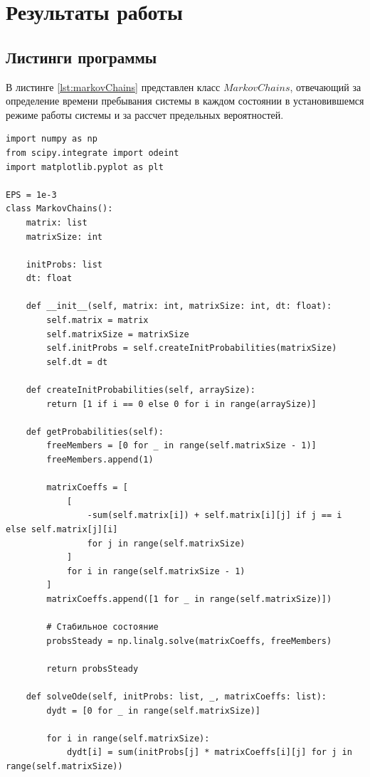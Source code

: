 \chapter{Результаты работы}

\section{Листинги программы}

В листинге \ref{lst:markovChains} представлен класс $MarkovChains$, отвечающий за определение времени пребывания системы в каждом состоянии в установившемся режиме работы системы и за рассчет предельных вероятностей.

\begin{lstlisting}[label=lst:markovChains, caption=class MarkovChains]
import numpy as np
from scipy.integrate import odeint
import matplotlib.pyplot as plt

EPS = 1e-3
class MarkovChains():
    matrix: list
    matrixSize: int

    initProbs: list
    dt: float

    def __init__(self, matrix: int, matrixSize: int, dt: float):
        self.matrix = matrix
        self.matrixSize = matrixSize
        self.initProbs = self.createInitProbabilities(matrixSize)
        self.dt = dt

    def createInitProbabilities(self, arraySize):
        return [1 if i == 0 else 0 for i in range(arraySize)]
  
    def getProbabilities(self):
        freeMembers = [0 for _ in range(self.matrixSize - 1)]
        freeMembers.append(1)

        matrixСoeffs = [
            [
                -sum(self.matrix[i]) + self.matrix[i][j] if j == i else self.matrix[j][i] 
                for j in range(self.matrixSize)
            ]
            for i in range(self.matrixSize - 1)
        ]
        matrixСoeffs.append([1 for _ in range(self.matrixSize)])

        # Стабильное состояние
        probsSteady = np.linalg.solve(matrixСoeffs, freeMembers)

        return probsSteady

    def solveOde(self, initProbs: list, _, matrixСoeffs: list):
        dydt = [0 for _ in range(self.matrixSize)]
        
        for i in range(self.matrixSize):
            dydt[i] = sum(initProbs[j] * matrixСoeffs[i][j] for j in range(self.matrixSize))


\end{lstlisting}
